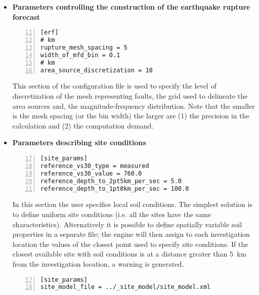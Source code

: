 \begin{itemize}
    In the second option all the possible realizations are created. 
    Below we provide an example for the latter option.
    In this case we set the \texttt{number\-\_of\-\_logic\_tree\_samples}
    to 0. \gls{acr:oqe} will perform a complete enumeration of all 
    the possible paths from the roots to the leaves of the logic tree 
    structure.
\begin{Verbatim}[frame=single, commandchars=\\\{\}, fontsize=\small,
    firstnumber=9, numbers=left, numbersep=2pt]
[logic_tree]
number_of_logic_tree_samples = 0
\end{Verbatim}
    If the seismic source logic tree and the ground motion
    logic tree do not contain epistemic uncertainties the engine will
    create a single PSHA input.
%
\item \textbf{Parameters controlling the construction of the earthquake 
    rupture forecast}
\begin{Verbatim}[frame=single, commandchars=\\\{\}, fontsize=\small,
    firstnumber=11, numbers=left, numbersep=2pt]
[erf]
# km
rupture_mesh_spacing = 5
width_of_mfd_bin = 0.1
# km
area_source_discretization = 10
\end{Verbatim}
This section of the configuration file is used to specify the 
level of discretization of the mesh representing faults, the grid
used to delineate the area sources and, the magnitude-frequency 
distribution. Note that the smaller is the mesh spacing (or the bin width) the larger 
are (1) the precision in the calculation and (2) the computation demand.
%
\item \textbf{Parameters describing site conditions}
\begin{Verbatim}[frame=single, commandchars=\\\{\}, fontsize=\small,
    firstnumber=17, numbers=left, numbersep=2pt]
[site_params]
reference_vs30_type = measured
reference_vs30_value = 760.0
reference_depth_to_2pt5km_per_sec = 5.0
reference_depth_to_1pt0km_per_sec = 100.0
\end{Verbatim}
In this section the user specifies local soil conditions. The simplest
solution is to define uniform site conditions (i.e. all the sites have 
the same characteristics). Alternatively it is possible to define 
spatially variable soil properties in a separate file; the engine will
then assign to each investigation location the values of the closest point
used to specify site conditions. If the closest available site with soil conditions is at a distance greater than 5~km from the investigation location, a warning is generated.
%
\begin{Verbatim}[frame=single, commandchars=\\\{\}, fontsize=\small,
    firstnumber=17, numbers=left, numbersep=2pt]
[site_params]
site_model_file = ../_site_model/site_model.xml
\end{Verbatim}


\end{itemize}
